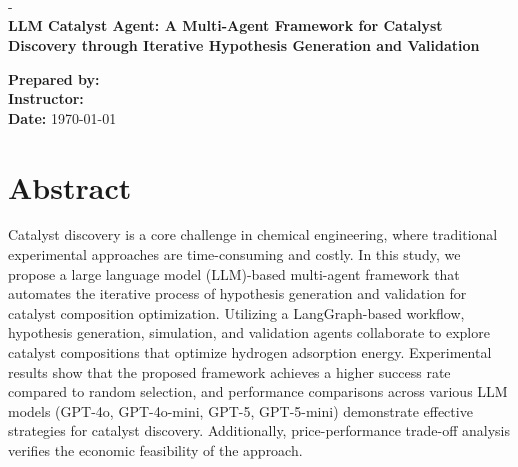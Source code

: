 \def \REPORTTITLE {LLM Catalyst Agent: A Multi-Agent Framework for Catalyst Discovery through Iterative Hypothesis Generation and Validation}




\begin{titlepage}
    \vfill
    \begin{center}
         \\
        \hfill \\
        \Large{\DEPARTEMENT} \\
        \Large{\COURSENUM\;-\;\COURSENAME} \\
        \vfill
        \textbf{\LARGE{\REPORTTITLE}}
    \end{center}
    \vfill
    \begin{flushleft}
        \Large{\textbf{Prepared by:} \STUDENTNAME} \\
        \Large{\textbf{Instructor:} \INSTRUCTOR} \\
        \Large{\textbf{Date:} \today}
    \end{flushleft}
    \vfill
\end{titlepage}

{
\centering
\section*{Abstract}
Catalyst discovery is a core challenge in chemical engineering, where traditional experimental approaches are time-consuming and costly. In this study, we propose a large language model (LLM)-based multi-agent framework that automates the iterative process of hypothesis generation and validation for catalyst composition optimization. Utilizing a LangGraph-based workflow, hypothesis generation, simulation, and validation agents collaborate to explore catalyst compositions that optimize hydrogen adsorption energy. Experimental results show that the proposed framework achieves a higher success rate compared to random selection, and performance comparisons across various LLM models (GPT-4o, GPT-4o-mini, GPT-5, GPT-5-mini) demonstrate effective strategies for catalyst discovery. Additionally, price-performance trade-off analysis verifies the economic feasibility of the approach.
\clearpage
}

\tableofcontents
\clearpage

\setlength{\parskip}{\baselineskip}%


